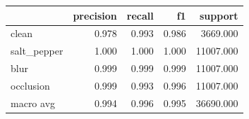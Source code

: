 \begin{tabular}{lrrrr}
\toprule
 & precision & recall & f1 & support \\
\midrule
clean & 0.978 & 0.993 & 0.986 & 3669.000 \\
salt_pepper & 1.000 & 1.000 & 1.000 & 11007.000 \\
blur & 0.999 & 0.999 & 0.999 & 11007.000 \\
occlusion & 0.999 & 0.993 & 0.996 & 11007.000 \\
macro avg & 0.994 & 0.996 & 0.995 & 36690.000 \\
\bottomrule
\end{tabular}
